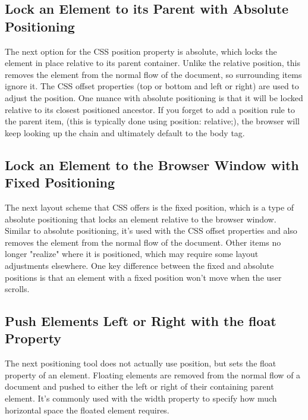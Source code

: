 \documentclass{article}%
\begin{document}
%
\subsection{Lock an Element to its Parent with Absolute Positioning}%
\label{subsec:LockanElementtoitsParentwithAbsolutePositioning}%
The next option for the CSS position property is absolute, which locks the element in place relative to its parent container. Unlike the relative position, this removes the element from the normal flow of the document, so surrounding items ignore it. The CSS offset properties (top or bottom and left or right) are used to adjust the position.\newline%
One nuance with absolute positioning is that it will be locked relative to its closest positioned ancestor. If you forget to add a position rule to the parent item, (this is typically done using position: relative;), the browser will keep looking up the chain and ultimately default to the body tag.\newline%

%
\subsection{Lock an Element to the Browser Window with Fixed Positioning}%
\label{subsec:LockanElementtotheBrowserWindowwithFixedPositioning}%
The next layout scheme that CSS offers is the fixed position, which is a type of absolute positioning that locks an element relative to the browser window. Similar to absolute positioning, it's used with the CSS offset properties and also removes the element from the normal flow of the document. Other items no longer "realize" where it is positioned, which may require some layout adjustments elsewhere.\newline%
One key difference between the fixed and absolute positions is that an element with a fixed position won't move when the user scrolls.\newline%

%
\subsection{Push Elements Left or Right with the float Property}%
\label{subsec:PushElementsLeftorRightwiththefloatProperty}%
The next positioning tool does not actually use position, but sets the float property of an element. Floating elements are removed from the normal flow of a document and pushed to either the left or right of their containing parent element. It's commonly used with the width property to specify how much horizontal space the floated element requires.\newline%
\end{document}
